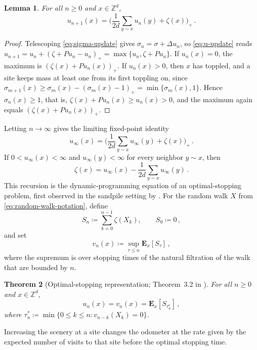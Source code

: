 \documentclass[11pt]{amsart}
\theoremstyle{plain}
\newtheorem{theorem}{Theorem}[section]
\newtheorem{lemma}[theorem]{Lemma}
\theoremstyle{definition}
\newcommand{\Z}{\mathbb{Z}}
\begin{document}
		\begin{lemma}\label{lem:recursion}
			For all $n \geq 0$ and $x\in\Z^d$,
			\begin{equation}\label{eq:odometer-recursion}
			u_{n+1}(x) = \biggl(\frac{1}{2d}\sum_{y \sim x} u_n(y) + \zeta(x)\biggr)_+\, .
			\end{equation}
		\end{lemma}
		\begin{proof}
			Telescoping \eqref{eq:sigma-update} gives $\sigma_n=\sigma+\Delta u_n$,
			so \eqref{eq:u-update} reads
			$u_{n+1}=u_n+(\zeta+Pu_n-u_n)_+=\max\{u_n,\zeta+Pu_n\}$.
			If $u_n(x)=0$, the maximum is $(\zeta(x)+Pu_n(x))_+$. If $u_n(x)>0$,
			then $x$ has toppled, and a site keeps mass at least one from its
			first toppling on, since
			$\sigma_{m+1}(x)\geq\sigma_m(x)-(\sigma_m(x)-1)_+=\min\{\sigma_m(x),1\}$.
			Hence $\sigma_n(x)\geq1$, that is, $\zeta(x)+Pu_n(x)\geq u_n(x)>0$,
			and the maximum again equals $(\zeta(x)+Pu_n(x))_+$.
		\end{proof}
		Letting $n\to\infty$ gives the limiting fixed-point identity
		\[
			u_\infty(x) = \biggl(\frac{1}{2d}\sum_{y \sim x} u_\infty(y) + \zeta(x)\biggr)_+\, .
		\]
		If $0<u_\infty(x)<\infty$ and $u_\infty(y)<\infty$ for every neighbor
		$y\sim x$, then
		\[
			\zeta(x) = u_\infty(x) - \frac{1}{2d}\sum_{y \sim x} u_\infty(y)\, .
		\]
		This recursion is the dynamic-programming
		equation of an optimal-stopping problem, first observed in the sandpile
		setting by \citet*{BPSH}. For the random walk $X$ from
		\eqref{eq:random-walk-notation}, define
		\[
			S_n \coloneqq \sum_{k=0}^{n-1}\zeta(X_k),
			\qquad S_0\coloneqq0\, ,
		\]
		and set
		\[
			v_n(x) \coloneqq \sup_{\tau \leq n} \mathbf E_x[S_\tau]\, ,
		\]
		where the supremum is over stopping times of the natural filtration of the walk that are bounded by $n$.

	\begin{theorem}[Optimal-stopping representation; Theorem~3.2 in \citealp{BPSH}]\label{thm:RW}
		For all $n \geq 0$ and $x\in\Z^d$,
		\[
			u_n(x) = v_n(x) = \mathbf E_x[S_{\tau_n^*}]\, ,
		\]
			where $\tau_n^* \coloneqq \min\bigl\{0 \leq k \leq n : v_{n-k}(X_k) = 0\bigr\}$.
	\end{theorem}

	Increasing the scenery at a site changes the odometer at the rate given by the
	expected number of visits to that site before the optimal stopping time.
\end{document}
